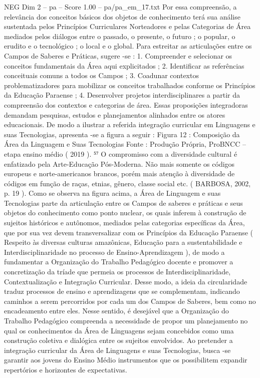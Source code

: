 \begin{textsample}{NEG Dim 2 – pa – Score 1.00 – pa/pa\_em\_17.txt}
Por essa compreensão, a relevância dos conceitos básicos dos objetos de conhecimento terá sua análise sustentada pelos Princípios Curriculares Norteadores e pelas Categorias de Área mediados pelos diálogos entre o passado, o presente, o futuro ; o popular, o erudito e o tecnológico ; o local e o global.
Para estreitar as articulações entre os Campos de Saberes e Práticas, sugere -se : 1.
Compreender e selecionar os conceitos fundamentais da Área aqui explicitados ; 2.
Identificar as referências conceituais comuns a todos os Campos ; 3.
Coadunar contextos problematizadores para mobilizar os conceitos trabalhados conforme os Princípios da Educação Paraense ; 4.
Desenvolver projetos interdisciplinares a partir da compreensão dos contextos e categorias de área.
Essas proposições integradoras demandam pesquisas, estudos e planejamentos alinhados entre os atores educacionais.
De modo a ilustrar a referida integração curricular em Linguagens e suas Tecnologias, apresenta -se a figura a seguir : Figura 12 : Composição da Área da Linguagem e Suas Tecnologias Fonte : Produção Própria, ProBNCC – etapa ensino médio ( 2019 ). ⁵⁷ O compromisso com a diversidade cultural é enfatizado pela Arte-Educação Pós-Moderna.
Não mais somente os códigos europeus e norte-americanos brancos, porém mais atenção à diversidade de códigos em função de raças, etnias, gênero, classe social etc. ( BARBOSA, 2002, p. 19 ).
Como se observa na figura acima, a Área de Linguagem e suas Tecnologias parte da articulação entre os Campos de saberes e práticas e seus objetos do conhecimento como ponto nuclear, os quais inferem à construção de sujeitos históricos e autônomos, mediados pelas categorias específicas da Área, que por sua vez devem transversalizar com os Princípios da Educação Paraense ( Respeito às diversas culturas amazônicas, Educação para a sustentabilidade e Interdisciplinaridade no processo de Ensino-Aprendizagem ), de modo a fundamentar a Organização do Trabalho Pedagógico docente e promover a concretização da tríade que permeia os processos de Interdisciplinaridade, Contextualização e Integração Curricular.
Desse modo, a ideia da circularidade traduz processos de ensino e aprendizagens que se complementam, indicando caminhos a serem percorridos por cada um dos Campos de Saberes, bem como no encadeamento entre eles.
Nesse sentido, é desejável que a Organização do Trabalho Pedagógico compreenda a necessidade de propor um planejamento no qual os conhecimentos da Área de Linguagens sejam concebidos como uma construção coletiva e dialógica entre os sujeitos envolvidos.
Ao pretender a integração curricular da Área de Linguagens e suas Tecnologias, busca -se garantir aos jovens do Ensino Médio instrumentos que os possibilitem expandir repertórios e horizontes de expectativas.

\end{textsample}
